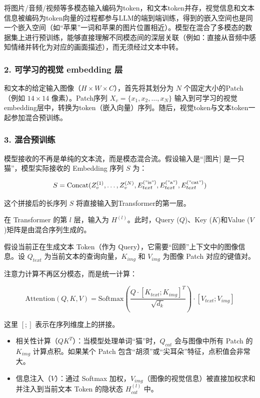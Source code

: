 将图片/音频/视频等多模态输入编码为token，和文本token并存，视觉信息和文本信息被编码为token向量的过程都参与LLM的端到端训练，得到的嵌入空间也是同一个嵌入空间（如``苹果''一词和苹果的图片位置相近）。模型在混合了多模态的数据集上进行预训练，能够直接理解不同模态间的深层关联（例如：直接从音频中感知情绪并转化为对应的画面描述），而无须经过文本中转。

\hypertarget{ux53efux5b66ux4e60ux7684ux89c6ux89c9-embedding-ux5c42}{%
\subsubsection{2. 可学习的视觉 embedding 层}\label{ux53efux5b66ux4e60ux7684ux89c6ux89c9-embedding-ux5c42}}

和文本的给定输入图像（\(H\times W\times C\)），首先将其划分为 \(N\) 个固定大小的Patch（例如 \(14\times14\) 像素）。Patch序列 \(X_v=\{x_1,x_2,\ldots,x_N\}\) 输入到可学习的视觉embedding层中，转换为token（嵌入向量）序列。随后，视觉token与文本token一起参加混合预训练。

\hypertarget{ux6df7ux5408ux9884ux8badux7ec3}{%
\subsubsection{3. 混合预训练}\label{ux6df7ux5408ux9884ux8badux7ec3}}

模型接收的不再是单纯的文本流，而是模态混合流。假设输入是``{[}图片{]} 是一只猫''，模型实际接收的 Embedding 序列 \(S\) 为：

\[
S=\mathrm{Concat}(Z_v^{(1)},\ldots,Z_v^{(N)},E_{text}^{(\mathrm{"is"})},E_{text}^{(\mathrm{"a"})},E_{text}^{(\mathrm{"cat"})})
\]

这个拼接后的长序列 \(S\) 将直接输入到Transformer的第一层。

在 Transformer 的第 \(l\) 层，输入为 \(H^{(l)}\)。此时，Query (\(Q\))、Key (\(K\))和Value (\(V\))矩阵是由混合序列生成的。

假设当前正在生成文本 Token（作为 Query），它需要``回顾''上下文中的图像信息。设 \(Q_{text}\) 为当前文本的查询向量，\(K_{img}\) 和 \(V_{img}\) 为图像 Patch 对应的键值对。

注意力计算不再区分模态，而是统一计算：

\[
\mathrm{Attention}(Q,K,V)=\mathrm{Softmax}\left(\frac{Q\cdot [K_{text};K_{img}]^T}{\sqrt{d_k}}\right)\cdot [V_{text};V_{img}]
\]

这里 \([;]\) 表示在序列维度上的拼接。

\begin{itemize}
\tightlist
\item
  相关性计算（\(QK^T\)）：当模型处理单词``猫''时，\(Q_{cat}\) 会与图像中所有 Patch 的 \(K_{img}\) 计算点积。如果某个 Patch 包含``胡须''或``尖耳朵''特征，点积值会非常大。
\item
  信息注入（\(V\)）：通过 Softmax 加权，\(V_{img}\)（图像的视觉信息）被直接加权求和并注入到当前文本 Token 的隐状态 \(H_{cat}^{(l)}\) 中。
\end{itemize}

